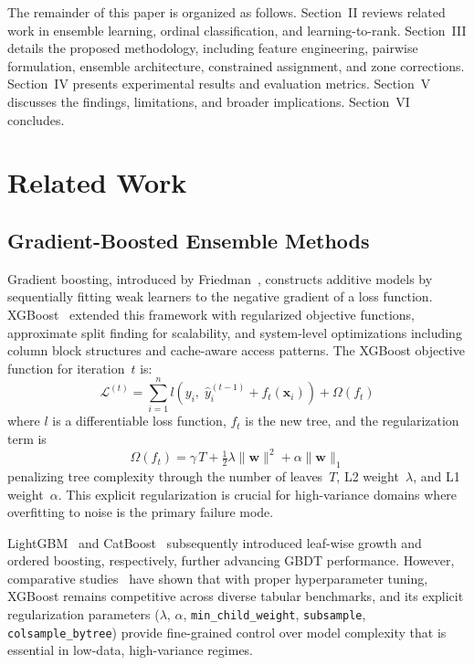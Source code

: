 \documentclass[conference]{IEEEtran}
\begin{document}
The remainder of this paper is organized as follows. Section~II reviews related work in ensemble learning, ordinal classification, and learning-to-rank. Section~III details the proposed methodology, including feature engineering, pairwise formulation, ensemble architecture, constrained assignment, and zone corrections. Section~IV presents experimental results and evaluation metrics. Section~V discusses the findings, limitations, and broader implications. Section~VI concludes.

\section{Related Work}

\subsection{Gradient-Boosted Ensemble Methods}

Gradient boosting, introduced by Friedman~\cite{friedman2001greedy}, constructs additive models by sequentially fitting weak learners to the negative gradient of a loss function. XGBoost~\cite{chen2016xgboost} extended this framework with regularized objective functions, approximate split finding for scalability, and system-level optimizations including column block structures and cache-aware access patterns. The XGBoost objective function for iteration~$t$ is:
\begin{equation}
\mathcal{L}^{(t)} = \sum_{i=1}^{n} l\!\left(y_i,\; \hat{y}_i^{(t-1)} + f_t(\mathbf{x}_i)\right) + \Omega(f_t)
\label{eq:xgb_obj}
\end{equation}
where $l$ is a differentiable loss function, $f_t$ is the new tree, and the regularization term is
\begin{equation}
\Omega(f_t) = \gamma\, T + \tfrac{1}{2}\lambda \|\mathbf{w}\|^2 + \alpha \|\mathbf{w}\|_1
\label{eq:xgb_reg}
\end{equation}
penalizing tree complexity through the number of leaves~$T$, L2 weight~$\lambda$, and L1 weight~$\alpha$. This explicit regularization is crucial for high-variance domains where overfitting to noise is the primary failure mode.

LightGBM~\cite{ke2017lightgbm} and CatBoost~\cite{prokhorenkova2018catboost} subsequently introduced leaf-wise growth and ordered boosting, respectively, further advancing GBDT performance. However, comparative studies~\cite{borisov2022deep} have shown that with proper hyperparameter tuning, XGBoost remains competitive across diverse tabular benchmarks, and its explicit regularization parameters ($\lambda$, $\alpha$, \texttt{min\_child\_weight}, \texttt{subsample}, \texttt{colsample\_bytree}) provide fine-grained control over model complexity that is essential in low-data, high-variance regimes.
\end{document}
